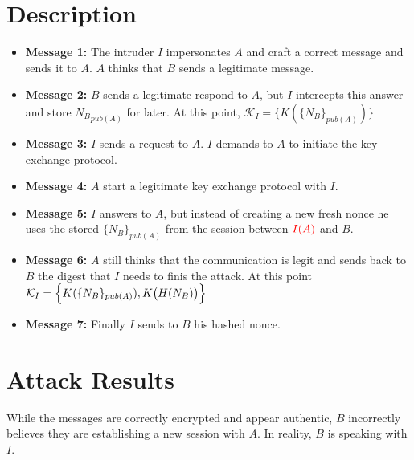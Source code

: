 \documentclass[11pt]{article}
\begin{document}
    \section{Description}
    \begin{itemize}
        \item \textbf{Message 1:} The intruder $I$ impersonates $A$ and craft a correct message and sends it to $A$. $A$
        thinks that $B$ sends a legitimate message.

        \item \textbf{Message 2:} $B$ sends a legitimate respond to $A$, but $I$ intercepts this answer and store
        ${N_B}_{pub(A)}$ for later. At this point, $\mathcal{K}_I = \bigl\{K(\{N_B\}_{pub(A)})\bigr\}$

        \item \textbf{Message 3:} $I$ sends a request to $A$. $I$ demands to $A$ to initiate the key exchange protocol.

        \item \textbf{Message 4:} $A$ start a legitimate key exchange protocol with $I$.

        \item \textbf{Message 5:} $I$ answers to $A$, but instead of creating a new fresh nonce he uses the stored $\{N_B\}_{pub(A)}$
        from the session between $\textcolor{red}{I(A)}$ and $B$.

        \item \textbf{Message 6:} $A$ still thinks that the communication is legit and sends back to $B$ the digest
        that $I$ needs to finis the attack. At this point $\mathcal{K}_I =\Bigl\{K(\{N_B\}_{pub(A)}), K\bigl(H(N_B)\bigr)\Bigr\} $

        \item \textbf{Message 7:} Finally $I$ sends to $B$ his hashed nonce.
    \end{itemize}

    \section{Attack Results}
    While the messages are correctly encrypted and appear authentic, $B$ incorrectly believes they are establishing a new session with $A$. In reality, $B$ is speaking with $I$.
\end{document}
